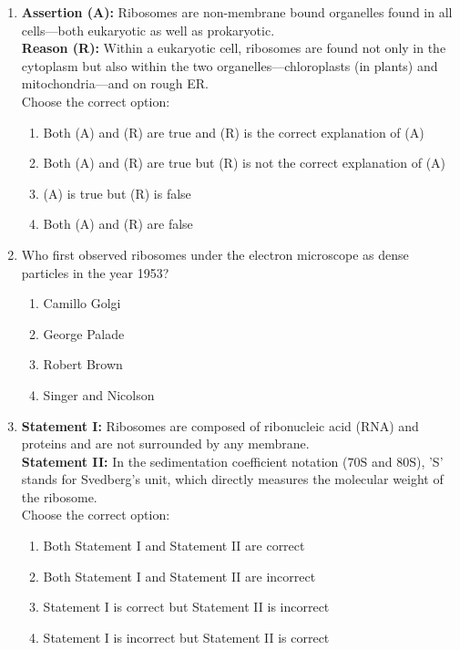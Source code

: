 \documentclass[11pt, a4paper]{article}
\begin{document}
\begin{enumerate}[label=\textbf{\arabic*.}, leftmargin=*, itemsep=8pt]
    \item \textbf{Assertion (A):} Ribosomes are non-membrane bound organelles found in all cells—both eukaryotic as well as prokaryotic.\\
    \textbf{Reason (R):} Within a eukaryotic cell, ribosomes are found not only in the cytoplasm but also within the two organelles—chloroplasts (in plants) and mitochondria—and on rough ER.\\
    Choose the correct option:
    \begin{enumerate}[label=(\alph*)]
        \item Both (A) and (R) are true and (R) is the correct explanation of (A)
        \item Both (A) and (R) are true but (R) is not the correct explanation of (A)
        \item (A) is true but (R) is false
        \item Both (A) and (R) are false
    \end{enumerate}

    \item Who first observed ribosomes under the electron microscope as dense particles in the year 1953?
    \begin{enumerate}[label=(\alph*)]
        \item Camillo Golgi
        \item George Palade
        \item Robert Brown
        \item Singer and Nicolson
    \end{enumerate}

    \item \textbf{Statement I:} Ribosomes are composed of ribonucleic acid (RNA) and proteins and are not surrounded by any membrane.\\
    \textbf{Statement II:} In the sedimentation coefficient notation ($70\text{S}$ and $80\text{S}$), 'S' stands for Svedberg's unit, which directly measures the molecular weight of the ribosome.\\
    Choose the correct option:
    \begin{enumerate}[label=(\alph*)]
        \item Both Statement I and Statement II are correct
        \item Both Statement I and Statement II are incorrect
        \item Statement I is correct but Statement II is incorrect
        \item Statement I is incorrect but Statement II is correct
    \end{enumerate}


\end{enumerate}
\end{document}
